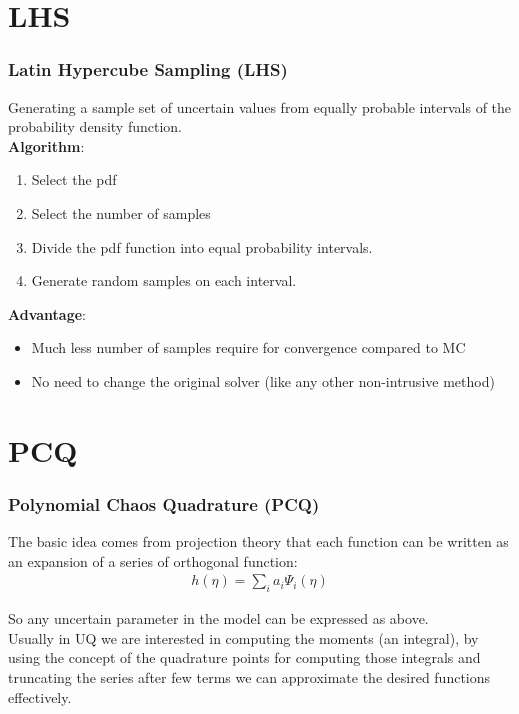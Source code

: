 \documentclass[10pt]{beamer}
\begin{document}
\section{LHS}
\begin{frame}
\frametitle{Latin Hypercube Sampling (LHS)}
Generating a sample set of uncertain values from equally probable intervals of the probability density function.\\

{\bf Algorithm}:

\begin{enumerate}
    \item Select the pdf
    \item Select the number of samples
    \item Divide the pdf function into equal probability intervals.
    \item Generate random samples on each interval.
\end{enumerate}
{\bf Advantage}:
\begin{itemize}
    \item Much less number of samples require for convergence compared to MC
    \item No need to change the original solver (like any other non-intrusive method)
\end{itemize}


\end{frame}
\section{PCQ}

\begin{frame}
\frametitle{Polynomial Chaos Quadrature (PCQ)}
The basic idea comes from projection theory that each function can be written as an expansion of a series of orthogonal function:\\
\begin{align*}
     h(\eta)= \sum_i a_i \Psi_i (\eta) 
\end{align*}

So any uncertain parameter in the model can be expressed as above. \\
Usually in UQ we are interested in computing the moments (an integral), by using the concept of the quadrature points for computing those integrals and truncating the series after few terms we can approximate the desired functions effectively.  



\end{frame}
\end{document}
